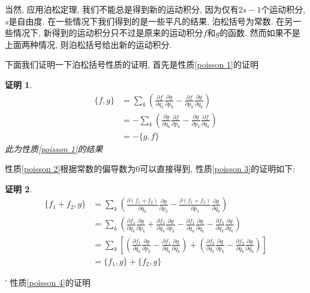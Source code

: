 \documentclass[a4paper,11pt]{article}
\theoremstyle{mystyle}
\newtheorem{Proof}{\hspace{2em}证明}[section]
\begin{document}
当然, 应用泊松定理, 我们不能总是得到新的运动积分, 因为仅有$2s-1$个运动积分, $s$是自由度. 在一些情况下我们得到的是一些平凡的结果, 泊松括号为常数. 在另一些情况下, 新得到的运动积分只不过是原来的运动积分$f$和$g$的函数. 然而如果不是上面两种情况, 则泊松括号给出新的运动积分.

\indent 下面我们证明一下泊松括号性质的证明, 首先是性质\ref{poisson 1}的证明
\begin{Proof}
\begin{equation*}
  \begin{split}
     \{f,g\}&=\sum_{k}\left(\frac{\partial f}{\partial{q_k}}\frac{\partial g}{\partial{p_k}}-\frac{\partial f}{\partial{p_k}}\frac{\partial g}{\partial{q_k}}\right) \\
       &=-\sum_{k}\left(\frac{\partial g}{\partial{q_k}}\frac{\partial f}{\partial{p_k}}-\frac{\partial g}{\partial{p_k}}\frac{\partial f}{\partial{q_k}}\right) \\
       &=-\{g,f\}
  \end{split}
\end{equation*}
此为性质\ref{poisson 1}的结果
\end{Proof}
性质\ref{poisson 2}根据常数的偏导数为$0$可以直接得到, 性质\ref{poisson 3}的证明如下:
\begin{Proof}
  \begin{equation*}
    \begin{split}
       \{f_1+f_2,g\}&=\sum_{k}\left(\frac{\partial{(f_1+f_2)}}{\partial{q_k}}\frac{\partial g}{\partial{p_k}}-\frac{\partial{(f_1+f_2)}}{\partial{p_k}}\frac{\partial g}{\partial{q_k}}\right) \\
         &=\sum_{k}\left(\frac{\partial f_1}{\partial{q_k}}\frac{\partial g}{\partial{p_k}}+\frac{\partial f_2}{\partial{q_k}}\frac{\partial g}{\partial{p_k}}-\frac{\partial f_1}{\partial{q_k}}\frac{\partial g}{\partial{q_k}}-\frac{\partial f_2}{\partial{q_k}}\frac{\partial g}{\partial{q_k}}\right) \\
         &=\sum_{k}\left[\left(\frac{\partial f_1}{\partial{q_k}}\frac{\partial g}{\partial{p_k}}-\frac{\partial f_1}{\partial{q_k}}\frac{\partial g}{\partial{q_k}}\right)+\left(\frac{\partial f_2}{\partial{q_k}}\frac{\partial g}{\partial{p_k}}-\frac{\partial f_2}{\partial{q_k}}\frac{\partial g}{\partial{q_k}}\right)\right] \\
         &=\{f_1,g\}+\{f_2,g\}
    \end{split}
  \end{equation*}
\end{Proof}'
性质\ref{poisson 4}的证明
\end{document}
